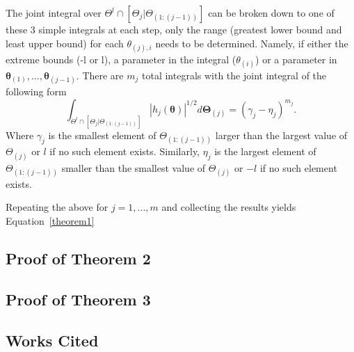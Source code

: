 \documentclass[Proceedings]{ascelike}
\begin{document}
The joint integral over
$\Theta^{l}\cap[\Theta_{j}|\Theta_{(1:(j-1))}]$ can be broken
down to one of these 3 simple integrals at each step, only the range
(greatest lower bound and least upper bound) for each $\theta_{(j),i}$
needs to be determined.  Namely, if either the extreme bounds (-l or
l), a parameter in the integral ($\theta_{(i)}$) or a parameter in
$\boldsymbol{\theta}_{(1)}, \ldots, \boldsymbol{\theta}_{(j-1)}$. There are $m_j$ total integrals with the joint integral of the following form
\[
\int_{\Theta^{l}\cap[\Theta_{j}|\Theta_{(1:(j-1))}]}
|h_j(\boldsymbol{\theta})|^{1/2}   
d\boldsymbol{\Theta}_{(j)}  =  (\gamma_j - \eta_j)^{m_j}.
\]
Where $\gamma_j$ is the smallest element of $\Theta_{(1:(j-1))}$ larger than the largest value of $\Theta_{(j)}$ or $l$ if no such element exists. Similarly, $\eta_j$ is the largest element of $\Theta_{(1:(j-1))}$ smaller than the smallest value of $\Theta_{(j)}$ or $-l$ if no such element exists.

Repeating the above for $j=1,..., m$ and collecting the results yields Equation~\eqref{theorem1}

\subsection*{Proof of Theorem 2}

\subsection*{Proof of Theorem 3}


\subsection*{Works Cited}\label{section:references}
%
%

%
%
%
\end{document}
